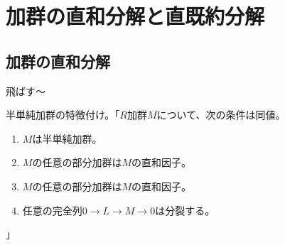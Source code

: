 \documentclass[9pt]{ltjsarticle}
\begin{document}
\section{加群の直和分解と直既約分解}
\label{sec:加群の直和分解と直既約分解}
\subsection{加群の直和分解}
\label{sub:加群の直和分解}

飛ばす～

半単純加群の特徴付け。「$R$加群$M$について、次の条件は同値。
\begin{enumerate}[label=(\arabic*)]
  \item $M$は半単純加群。
  \item $M$の任意の部分加群は$M$の直和因子。
  \item $M$の任意の部分加群は$M$の直和因子。
  \item 任意の完全列$0\to L \to M \to 0$は分裂する。
\end{enumerate}」
\end{document}
